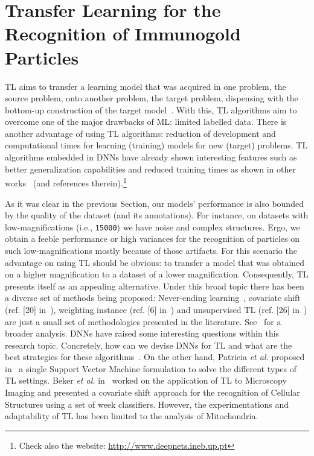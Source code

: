 \documentclass[a4paper,11pt]{article}
\newcommand{\1}{\mathbbm{1}}
\newcommand{\etal}{\emph{et al.} }
\newcommand{\db}[1]{\texttt{#1}}
\theoremstyle{plain}
\begin{document}
\section{Transfer Learning for the Recognition of Immunogold Particles}
\label{sec:TL}
\ac{TL} aims to transfer a learning model that was acquired in one problem, the source problem, onto another problem, the target problem, dispensing with the bottom-up construction of the target model~\cite{RGamelasSousaIWANN2015}. With this, \ac{TL} algorithms aim to overcome one of the major drawbacks of \ac{ML}: limited labelled data. There is another advantage of using \ac{TL} algorithms: reduction of development and computational times for learning (training) models for new (target) problems. TL algorithms embedded in \acp{DNN} have already shown interesting features such as better generalization capabilities and reduced training times as shown in other works~\cite{Chetak2014} (and references therein).\footnote{Check also the website: \url{http://www.deepnets.ineb.up.pt}}

As it was clear in the previous Section, our models' performance is also bounded by the quality of the dataset (and its annotations). For instance, on datasets with low-magnifications (i.e., \db{15000}) we have noise and complex structures. Ergo, we obtain a feeble performance or high variances for the recognition of particles on such low-magnifications mostly because of those artifacts. For this scenario the advantage on using \ac{TL} should be obvious: to transfer a model that was obtained on a higher magnification to a dataset of a lower magnification. Consequently, \ac{TL} presents itself as an appealing alternative.
Under this broad topic there has been a diverse set of methods being proposed: Never-ending learning~\cite{thrun1996learning}, covariate shift (ref. [20] in~\cite{pan2010survey}), weighting instance (ref. [6] in~\cite{pan2010survey}) and unsupervised TL (ref. [26] in~\cite{pan2010survey,mesnil2012unsupervised}) are just a small set of methodologies presented in the literature. See~\cite{pan2010survey} for a broader analysis. \acp{DNN} have raised some interesting questions within this research topic. Concretely, how can we devise \acp{DNN} for \ac{TL} and what are the best strategies for these algorithms~\cite{kandaswamy2014,RGamelasSousaIWANN2015}. On the other hand, Patricia \etal proposed in~\cite{patricia2014} a single Support Vector Machine formulation to solve the different types of \ac{TL} settings.
Beker \etal in~\cite{becker2014} worked on the application of TL to Microscopy Imaging and presented a covariate shift approach for the recognition of Cellular Structures using a set of week classifiers. However, the experimentations and adaptability of \ac{TL} has been limited to the analysis of Mitochondria.
\end{document}
